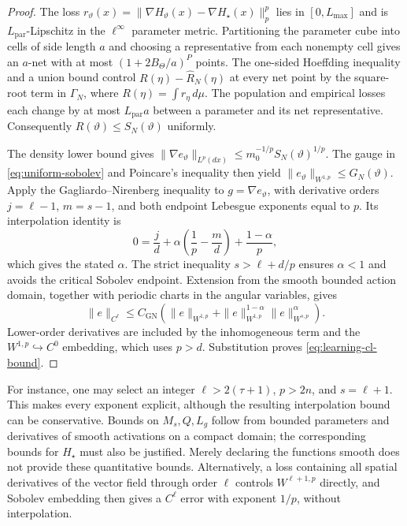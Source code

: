 \begin{proof}
The loss $r_\vartheta(x)=\|\nabla H_\vartheta(x)-\nabla H_\star(x)\|_p^p$
lies in $[0,L_{\max}]$ and is $L_{\mathrm{par}}$-Lipschitz in the
$\ell^\infty$ parameter metric. Partitioning the parameter cube into cells of
side length $a$ and choosing a representative from each nonempty cell gives
an $a$-net with at most $(1+2B_\Theta/a)^P$ points.
The one-sided Hoeffding inequality and a union bound control
$R(\eta)-\widehat R_N(\eta)$ at every net point by the square-root term in
$\Gamma_N$, where $R(\eta)=\int r_\eta\,d\mu$.
The population and empirical losses each change by at most
$L_{\mathrm{par}}a$ between a parameter and its net representative.
Consequently $R(\vartheta)\leq S_N(\vartheta)$ uniformly.

The density lower bound gives
$\|\nabla e_\vartheta\|_{L^p(dx)}\leq m_0^{-1/p}S_N(\vartheta)^{1/p}$.
The gauge in \eqref{eq:uniform-sobolev} and Poincare's inequality then yield
$\|e_\vartheta\|_{W^{1,p}}\leq G_N(\vartheta)$.
Apply the Gagliardo--Nirenberg inequality to $g=\nabla e_\vartheta$,
with derivative orders $j=\ell-1$, $m=s-1$, and both endpoint
Lebesgue exponents equal to $p$. Its interpolation identity is
\[
 0=\frac{j}{d}+\alpha\left(\frac1p-\frac{m}{d}\right)
     +\frac{1-\alpha}{p},
\]
which gives the stated $\alpha$.
The strict inequality $s>\ell+d/p$ ensures $\alpha<1$ and avoids the
critical Sobolev endpoint. Extension from the smooth bounded action domain,
together with periodic charts in the angular variables, gives
\[
 \|e\|_{C^\ell}
 \leq C_{\mathrm{GN}}\left(
 \|e\|_{W^{1,p}}+
 \|e\|_{W^{1,p}}^{1-\alpha}\|e\|_{W^{s,p}}^\alpha\right).
\]
Lower-order derivatives are included by the inhomogeneous term and the
$W^{1,p}\hookrightarrow C^0$ embedding, which uses $p>d$.
Substitution proves \eqref{eq:learning-cl-bound}.
\end{proof}

For instance, one may select an integer $\ell>2(\tau+1)$, $p>2n$, and
$s=\ell+1$. This makes every exponent explicit, although the resulting
interpolation bound can be conservative. Bounds on $M_s,Q,L_g$ follow from
bounded parameters and derivatives of smooth activations on a compact domain;
the corresponding bounds for $H_\star$ must also be justified. Merely declaring
the functions smooth does not provide these quantitative bounds.
Alternatively, a loss containing all spatial derivatives of the vector field
through order $\ell$ controls $W^{\ell+1,p}$ directly, and Sobolev embedding
then gives a $C^\ell$ error with exponent $1/p$, without interpolation.

